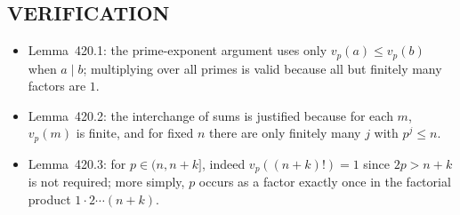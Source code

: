 \subsection*{VERIFICATION}
\begin{itemize}
\item Lemma~420.1: the prime-exponent argument uses only $v_p(a)\le v_p(b)$ when $a\mid b$; multiplying over all primes is valid because all but finitely many factors are $1$.
\item Lemma~420.2: the interchange of sums is justified because for each $m$, $v_p(m)$ is finite, and for fixed $n$ there are only finitely many $j$ with $p^j\le n$.
\item Lemma~420.3: for $p\in(n,n+k]$, indeed $v_p((n+k)!)=1$ since $2p>n+k$ is not required; more simply, $p$ occurs as a factor exactly once in the factorial product $1\cdot2\cdots(n+k)$.
\end{itemize}

